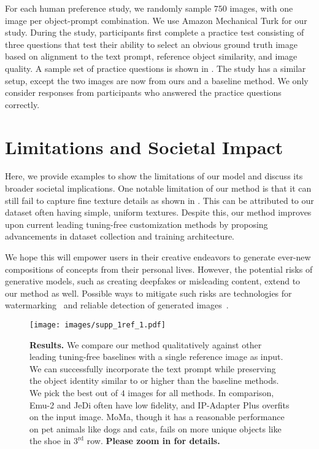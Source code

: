 For each human preference study, we randomly sample $750$ images, with one image per object-prompt combination. We use Amazon Mechanical Turk for our study. During the study, participants first complete a practice test consisting of three questions that test their ability to select an obvious ground truth image based on alignment to the text prompt, reference object similarity, and image quality. A sample set of practice questions is shown in . The study has a similar setup, except the two images are now from ours and a baseline method. We only consider responses from participants who answered the practice questions correctly.  

\section{Limitations and Societal Impact}
Here, we provide examples to show the limitations of our model and discuss its broader societal implications. One notable limitation of our method is that it can still fail to capture fine texture details as shown in . This can be attributed to our dataset often having simple, uniform textures. Despite this, our method improves upon current leading tuning-free customization methods by proposing advancements in dataset collection and training architecture. 

We hope this will empower users in their creative endeavors to generate ever-new compositions of concepts from their personal lives. However, the potential risks of generative models, such as creating deepfakes or misleading content, extend to our method as well. Possible ways to mitigate such risks are technologies for watermarking~\cite{fernandez2023stable} and reliable detection of generated images~\cite{wang2020cnn,corvi2022detection,cazenavette2024fakeinversion}.

\clearpage

\begin{figure*}[!t]
    \centering
    \texttt{[image: images/supp\_1ref\_1.pdf]}
    \vspace{-10pt}
    \caption{{\textbf{Results.} We compare our method qualitatively against other leading tuning-free baselines with a single reference image as input. We can successfully incorporate the text prompt while preserving the object identity similar to or higher than the baseline methods. We pick the best out of $4$ images for all methods. In comparison, Emu-2 and JeDi often have low fidelity, and IP-Adapter Plus overfits on the input image. MoMa, though it has a reasonable performance on pet animals like dogs and cats, fails on more unique objects like the shoe in $3^{\text{rd}}$ row. \textbf{Please zoom in for details.}
    }}
    \vspace{-10pt}
\end{figure*}

